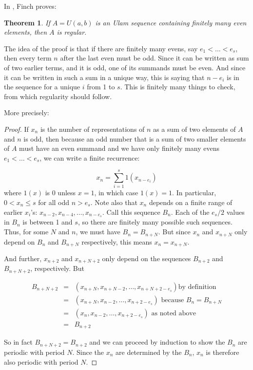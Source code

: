 \documentclass{report}
\newtheorem{theorem}{Theorem}[section]
\theoremstyle{remark}
\numberwithin{equation}{section}
\begin{document}
In \cite{finch:em1992}, Finch proves:

\begin{theorem}
  If $A = U(a,b)$ is an Ulam sequence containing finitely many even
  elements, then $A$ is regular.
\end{theorem}

The idea of the proof is that if there are finitely many evens, say
$e_1 < \ldots < e_s$, then every term $n$ after the last even must be
odd.  Since it can be written as sum of two earlier terms, and it is
odd, one of its summands must be even.  And since it can be written in
such a sum in a unique way, this is saying that $n - e_i$ is in the
sequence for a unique $i$ from 1 to $s$.  This is finitely many things
to check, from which regularity should follow.

More precisely:

\begin{proof}

  If $x_n$ is the number of representations of $n$ as a sum of two
  elements of $A$ and $n$ is odd, then because an odd number that is a
  sum of two smaller elements of $A$ must have an even summand and we
  have only finitely many evens $e_1 < \ldots < e_s$, we can write a
  finite recurrence:

  \[x_n = \sum_{i=1}^s 1(x_{n-e_i})\]
  where $1(x)$ is 0 unless $x = 1$, in which case $1(x) = 1$.  In
  particular, $0 < x_n \leq s$ for all odd $n > e_s$.  Note also that
  $x_n$ depends on a finite range of earlier $x_i$'s:
  $x_{n-2}, x_{n-4}, \ldots, x_{n-e_s}$.  Call this sequence $B_n$.
  Each of the $e_s/2$ values in $B_n$ is between 1 and $s$, so there
  are finitely many possible such sequences.  Thus, for some $N$ and
  $n$, we must have $B_n = B_{n+N}$.  But since $x_n$ and $x_{n+N}$
  only depend on $B_n$ and $B_{n+N}$ respectively, this means
  $x_n = x_{n+N}$.

  And further, $x_{n+2}$ and $x_{n+N+2}$ only depend on the sequences
  $B_{n+2}$ and $B_{n+N+2}$, respectively.  But 

  \begin{eqnarray*}
    B_{n+N+2} &=& (x_{n+N}, x_{n+N-2}, \ldots, x_{n+N+2-e_s}) \text{
    by definition}\\
    &=& (x_{n+N}, x_{n-2}, \ldots, x_{n+2-e_s}) \text{ because $B_n
                                                  = B_{n+N}$}\\
    &=& (x_{n}, x_{n-2}, \ldots, x_{n+2-e_s}) \text{ as noted
                                                above}\\
              &=& B_{n+2}
  \end{eqnarray*}

  So in fact $B_{n+N+2} = B_{n+2}$ and we can proceed by induction to
  show the $B_n$ are periodic with period $N$.  Since the $x_n$ are
  determined by the $B_n$, $x_n$ is therefore also periodic with
  period $N$.
\end{proof}
\end{document}
